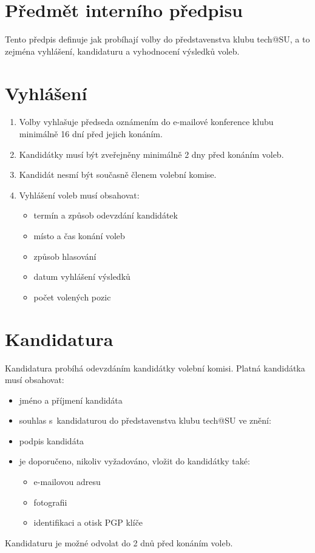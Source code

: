\documentclass[10pt]{article}
\begin{document}
\section{Předmět interního předpisu}
	Tento předpis definuje jak probíhají volby do představenstva klubu tech@SU, a to zejména vyhlášení, kandidaturu a vyhodnocení výsledků voleb.

\section{Vyhlášení}
	\begin{enumerate}
		\item Volby vyhlašuje předseda oznámením do e-mailové konference klubu minimálně 16 dní před jejich konáním.
		\item Kandidátky musí být zveřejněny minimálně 2 dny před konáním voleb.
		\item Kandidát nesmí být současně členem volební komise.
		\item Vyhlášení voleb musí obsahovat:
			\begin{itemize}
				\item termín a způsob odevzdání kandidátek
				\item místo a čas konání voleb
				\item způsob hlasování
				\item datum vyhlášení výsledků
				\item počet volených pozic
			\end{itemize}
	\end{enumerate}
	
\section{Kandidatura}
	Kandidatura probíhá odevzdáním kandidátky volební komisi. Platná kandidátka musí obsahovat:
	\begin{itemize}
		\item jméno a příjmení kandidáta
		\item souhlas s~kandidaturou do představenstva klubu tech@SU ve znění: 
		\item podpis kandidáta
		\item je doporučeno, nikoliv vyžadováno, vložit do kandidátky také: 
			\begin{itemize}
				\item e-mailovou adresu
				\item fotografii
				\item identifikaci a otisk PGP klíče
			\end{itemize}
	\end{itemize}
	Kandidaturu je možné odvolat do 2 dnů před konáním voleb.
	
\end{document}
